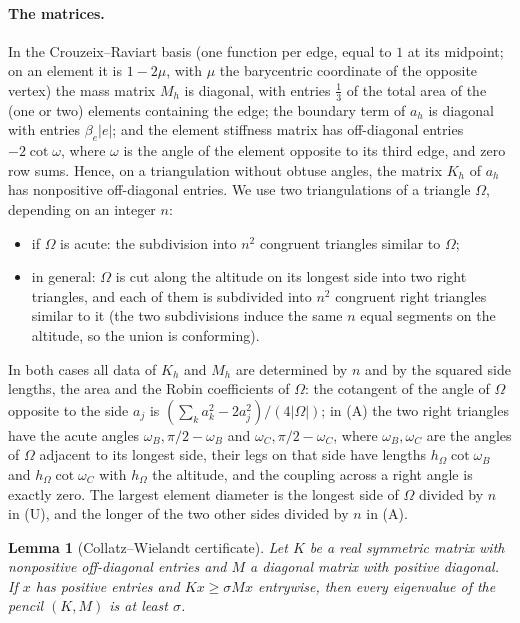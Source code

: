 \documentclass[11pt]{article}
\newtheorem{lemma}[theorem]{Lemma}
\theoremstyle{remark}
\begin{document}
\paragraph{The matrices.} In the Crouzeix--Raviart basis (one function per edge, equal to $1$
at its midpoint; on an element it is $1-2\mu$, with $\mu$ the barycentric coordinate of the
opposite vertex) the mass matrix $M_h$ is diagonal, with entries $\frac13$ of the total area of
the (one or two) elements containing the edge; the boundary term of $a_h$ is diagonal with
entries $\beta_e|e|$; and the element stiffness matrix has off-diagonal entries
$-2\cot\omega$, where $\omega$ is the angle of the element opposite to its third edge, and zero
row sums. Hence, on a triangulation without obtuse angles, the matrix $K_h$ of $a_h$ has
nonpositive off-diagonal entries. We use two triangulations of a triangle $\Omega$, depending on
an integer $n$:
\begin{itemize}
\item[(U)] if $\Omega$ is acute: the subdivision into $n^2$ congruent triangles similar to
$\Omega$;
\item[(A)] in general: $\Omega$ is cut along the altitude on its longest side into two right
triangles, and each of them is subdivided into $n^2$ congruent right triangles similar to it
(the two subdivisions induce the same $n$ equal segments on the altitude, so the union is
conforming).
\end{itemize}
In both cases all data of $K_h$ and $M_h$ are determined by $n$ and by the squared side
lengths, the area and the Robin coefficients of $\Omega$: the cotangent of the angle of
$\Omega$ opposite to the side $a_j$ is $(\sum_ka_k^2-2a_j^2)/(4|\Omega|)$; in (A) the two right
triangles have the acute angles $\omega_B,\pi/2-\omega_B$ and $\omega_C,\pi/2-\omega_C$, where
$\omega_B,\omega_C$ are the angles of $\Omega$ adjacent to its longest side, their legs on that
side have lengths $h_\Omega\cot\omega_B$ and $h_\Omega\cot\omega_C$ with $h_\Omega$ the altitude,
and the coupling across a right angle is exactly zero. The largest element diameter is the
longest side of $\Omega$ divided by $n$ in (U), and the longer of the two other sides divided by
$n$ in (A).

\begin{lemma}[Collatz--Wielandt certificate]\label{p-lem:CW}
Let $K$ be a real symmetric matrix with nonpositive off-diagonal entries and $M$ a diagonal
matrix with positive diagonal. If $x$ has positive entries and $Kx\ge\sigma Mx$ entrywise, then
every eigenvalue of the pencil $(K,M)$ is at least $\sigma$.
\end{lemma}
\end{document}
